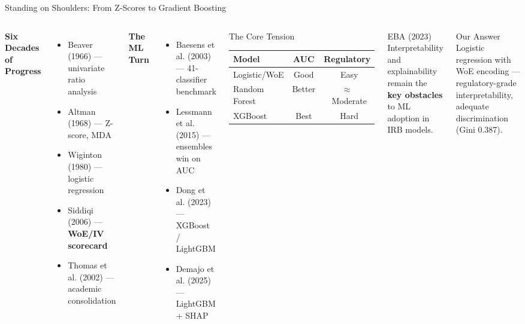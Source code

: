 \documentclass[aspectratio=169,11pt]{beamer}
\newcommand{\yes}{\textcolor{okgreen}{\checkmark}}
\newcommand{\no}{\textcolor{alertred}{\texttimes}}
\newcommand{\warn}{\textcolor{itcgold}{$\approx$}}
\newcommand{\B}[1]{\textbf{#1}}
\begin{document}
\begin{frame}[shrink=8]{Standing on Shoulders: From Z-Scores to Gradient Boosting}
  \begin{columns}[T]
      \textbf{Six Decades of Progress}
      \begin{itemize}\small
        \item Beaver (1966) --- univariate ratio analysis
        \item Altman (1968) --- Z-score, MDA
        \item Wiginton (1980) --- logistic regression
        \item Siddiqi (2006) --- \B{WoE/IV scorecard}
        \item Thomas et al. (2002) --- academic consolidation
      \end{itemize}
      \vspace{4pt}
      \textbf{The ML Turn}
      \begin{itemize}\small
        \item Baesens et al. (2003) --- 41-classifier benchmark
        \item Lessmann et al. (2015) --- ensembles win on AUC
        \item Dong et al. (2023) --- XGBoost / LightGBM
        \item Demajo et al. (2025) --- LightGBM + SHAP
      \end{itemize}

      \begin{block}{The Core Tension}\small
        \vspace{2pt}
        \centering
        \begin{tabular}{lcc}
          \toprule
          \textbf{Model} & \textbf{AUC} & \textbf{Regulatory}\\
          \midrule
          Logistic/WoE & Good   & \yes\ Easy\\
          Random Forest & Better & \warn\ Moderate\\
          XGBoost       & Best   & \no\ Hard\\
          \bottomrule
        \end{tabular}
        \vspace{2pt}
      \end{block}
      \vspace{4pt}
      \begin{alertblock}{EBA (2023)}\small
        Interpretability and explainability remain the \B{key obstacles} to ML adoption in IRB models.
      \end{alertblock}
      \vspace{4pt}
      \begin{block}{Our Answer}\small
        Logistic regression with WoE encoding --- regulatory-grade interpretability, adequate discrimination (Gini 0.387).
      \end{block}
  \end{columns}
\end{frame}
\end{document}
